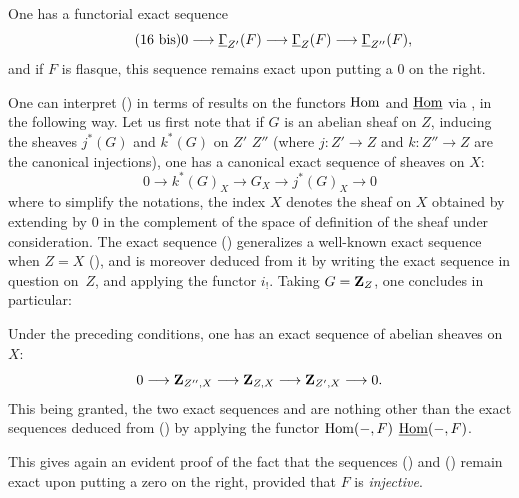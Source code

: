 \begin{corollary} \label{I.1.9}
One has a functorial exact sequence
\begin{equation*} \label{eq:I.16bis} \tag{16 bis} {0 \to \sheaf{\Gamma}_{Z'}(F) \to \sheaf{\Gamma}_Z(F) \to \sheaf{\Gamma}_{Z''}(F)},
\end{equation*}
and if $F$ is flasque, this sequence remains exact upon putting a $0$
on the right.
\end{corollary}

One can interpret () in terms of results on the functors
$\operatorname{Hom}$ and $\operatorname{\underline{Hom}}$ via , in the following way. Let us
first note that if $G$ is an abelian sheaf on $Z$, inducing the sheaves
$j^*(G)$ and $k^*(G)$ on $Z'$ \resp $Z''$ (where $j\colon Z' \to Z$
and $k\colon Z'' \to Z$ are the canonical injections), one has a
canonical exact sequence of sheaves on $X$:
\begin{equation} \label{eq:I.17} {0 \to k^*(G)_X \to G_X \to j^*(G)_X \to 0}
\end{equation}
where to simplify the notations, the index $X$ denotes the sheaf on
$X$ obtained by extending by $0$ in the complement of the space of
definition of the sheaf under consideration. The exact sequence
() generalizes a well-known exact sequence when $Z=X$
(\cf \cite{Godement}), and is moreover deduced from it by writing the
exact sequence in question on~$Z$, and applying the functor $i_!$.
Taking $G=\mathbf{Z}_{Z}$, one concludes in particular:

\begin{proposition} \label{I.1.10}
Under the preceding conditions, one has an exact sequence of abelian
sheaves on $X$:
\begin{equation} \label{eq:I.18} {0 \to \ZZ_{Z{''}, X} \to \ZZ_{Z, X} \to \ZZ_{Z', X} \to 0}.
\end{equation}
This being granted, the two exact sequences  and 
are nothing other than the exact sequences deduced from
() by applying the functor $\operatorname{Hom}(-, F)$ \resp
$\operatorname{\underline{Hom}}(-, F)$.
\end{proposition}

This gives again an evident proof of the fact that the sequences
() and () remain exact upon putting a
zero on the right, provided that $F$ is \textit{injective}.
